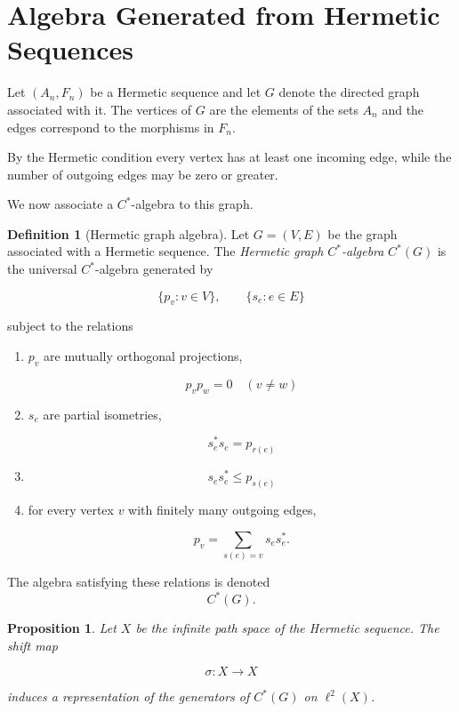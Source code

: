 \documentclass[11pt]{book}
\theoremstyle{definition}
\newtheorem{definition}{Definition}[section]
\theoremstyle{plain}
\newtheorem{proposition}[theorem]{Proposition}
\theoremstyle{remark}
\begin{document}
\section{Algebra Generated from Hermetic Sequences}
Let $(A_n,F_n)$ be a Hermetic sequence and let
$G$ denote the directed graph associated with it.
The vertices of $G$ are the elements of the sets $A_n$
and the edges correspond to the morphisms in $F_n$.

By the Hermetic condition every vertex has at least
one incoming edge, while the number of outgoing edges
may be zero or greater.

We now associate a $C^*$-algebra to this graph.

\begin{definition}[Hermetic graph algebra]
Let $G=(V,E)$ be the graph associated with a Hermetic
sequence. The \emph{Hermetic graph $C^*$-algebra}
$C^*(G)$ is the universal $C^*$-algebra generated by

\[
\{p_v : v\in V\}, \qquad \{s_e : e\in E\}
\]

subject to the relations

\begin{enumerate}
\item $p_v$ are mutually orthogonal projections,

\[
p_v p_w = 0 \quad (v\neq w)
\]

\item $s_e$ are partial isometries,

\[
s_e^* s_e = p_{r(e)}
\]

\item

\[
s_e s_e^* \le p_{s(e)}
\]

\item for every vertex $v$ with finitely many outgoing edges,

\[
p_v=\sum_{s(e)=v} s_e s_e^* .
\]

\end{enumerate}

The algebra satisfying these relations is denoted
\[
C^*(G).
\]
\end{definition}

\begin{proposition}
Let $X$ be the infinite path space of the Hermetic
sequence. The shift map

\[
\sigma:X\to X
\]

induces a representation of the generators of $C^*(G)$
on $\ell^2(X)$.
\end{proposition}
\end{document}
